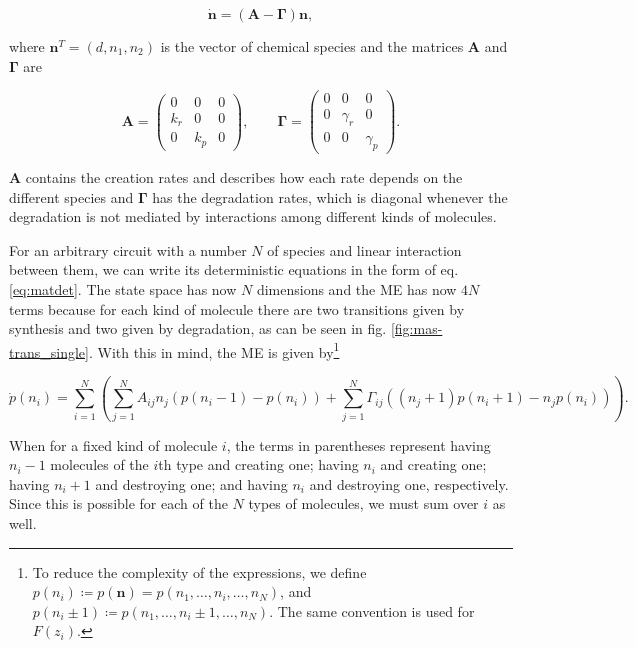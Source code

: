 \begin{equation}
  \label{eq:matdet}
  \mathbf{\dot{n}} = \left( \mathbf{A} - \mathbf{\Gamma} \right) \mathbf{n},
\end{equation}

where $\mathbf{n}^T=(d,n_1,n_2)$ is the vector of chemical species and the matrices $\mathbf{A}$ and $\mathbf{\Gamma}$ are

\begin{equation}
  \label{eq:mas_G_single}
  \mathbf{A} =
  \begin{pmatrix}
    0 & 0 & 0 \\
    k_r & 0 & 0 \\
    0 & k_p & 0
  \end{pmatrix},\quad\quad
  \mathbf{\Gamma} =
  \begin{pmatrix}
    0 & 0 & 0 \\
    0 & \gamma_r & 0 \\
    0 & 0 & \gamma_p 
  \end{pmatrix}. 
\end{equation}

$\mathbf{A}$ contains the creation rates and describes how each rate depends on the different species and $\mathbf{\Gamma}$ has the degradation rates, which is diagonal whenever the degradation is not mediated by interactions among different kinds of molecules.

For an arbitrary circuit with a number $N$ of species and linear interaction between them, we can write its deterministic equations in the form of eq. \eqref{eq:matdet}. The state space has now $N$ dimensions and the ME has now $4N$ terms because for each kind of molecule there are two transitions given by synthesis and two given by degradation, as can be seen in fig. \ref{fig:mas-trans_single}. With this in mind, the ME is given by\footnote{To reduce the complexity of the expressions, we define $p(n_i) \coloneqq p(\mathbf{n}) = p(n_1,\dotsc,n_i,\dotsc,n_N)$, and $p(n_i\pm1)\coloneqq p(n_1,\dotsc,n_i\pm1,\dotsc,n_N)$. The same convention is used for $F(z_i)$.}

\begin{equation}
  \label{eq:masterg1}
  \dot{p}(n_i) =  \sum_{i=1}^N\left(\sum_{j=1}^N A_{ij}n_j \left( p(n_i-1) - p(n_i) \right) + \sum_{j=1}^N \Gamma_{ij}\left((n_j+1)p(n_i+1)-n_jp(n_i)\right)\right).
\end{equation}

When for a fixed kind of molecule $i$, the terms in parentheses represent having $n_i-1$ molecules of the $i$th type and creating one; having $n_i$ and creating one; having $n_i+1$ and destroying one; and having $n_i$ and destroying one, respectively. Since this is possible for each of the $N$ types of molecules, we must sum over $i$ as well.

